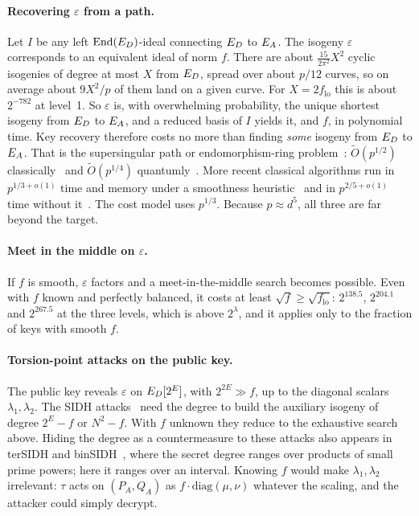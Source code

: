 \paragraph{Recovering $\varepsilon$ from a path.} Let $I$ be any left
$\operatorname{End}(E_D)$-ideal connecting $E_D$ to $E_A$. The isogeny $\varepsilon$
corresponds to an equivalent ideal of norm $f$. There are about
$\tfrac{15}{2\pi^2}X^2$ cyclic isogenies of degree at most $X$ from $E_D$,
spread over about $p/12$ curves, so on average about $9X^2/p$ of them land
on a given curve. For $X=2f_{\mathrm{lo}}$ this is about $2^{-782}$ at
level~1. So $\varepsilon$
is, with overwhelming probability, the unique shortest isogeny from $E_D$ to
$E_A$, and a reduced basis of $I$ yields it, and $f$, in polynomial time.
Key recovery therefore costs no more than finding \emph{some} isogeny from
$E_D$ to $E_A$. That is the supersingular path or endomorphism-ring
problem~\cite{EHLMP18,Wes22}: $\tilde O(p^{1/2})$ classically~\cite{DG16}
and $\tilde O(p^{1/4})$ quantumly~\cite{BJS14}. More recent classical
algorithms run in $p^{1/3+o(1)}$ time and memory under a smoothness
heuristic~\cite{Wes26} and in $p^{2/5+o(1)}$ time without it~\cite{Udo26}.
The cost model uses $p^{1/3}$. Because $p\approx d^5$, all three
are far beyond the target.

\paragraph{Meet in the middle on $\varepsilon$.} If $f$ is smooth, $\varepsilon$
factors and a meet-in-the-middle search becomes possible. Even with $f$
known and perfectly balanced, it costs at least $\sqrt f\ge\sqrt{f_{\mathrm{lo}}}$:
$2^{138.5}$, $2^{204.1}$ and $2^{267.5}$ at the three levels, which is above
$2^\lambda$, and it applies only to the fraction of keys with smooth $f$.

\paragraph{Torsion-point attacks on the public key.} The public key reveals
$\varepsilon$ on $E_D[2^E]$, with $2^{2E}\gg f$, up to the diagonal scalars
$\lambda_1,\lambda_2$. The SIDH attacks~\cite{CD23,MMPPW23,Rob23} need the
degree to build the auxiliary isogeny of degree $2^E-f$ or $N^2-f$. With $f$
unknown they reduce to the exhaustive search above. Hiding the degree as a
countermeasure to these attacks also appears in terSIDH and
binSIDH~\cite{BF23}, where the secret degree ranges over products of small
prime powers; here it ranges over an interval. Knowing $f$ would make
$\lambda_1,\lambda_2$ irrelevant: $\tau$ acts on $(P_A,Q_A)$ as
$f\cdot\mathrm{diag}(\mu,\nu)$ whatever the scaling, and the attacker could
simply decrypt.

